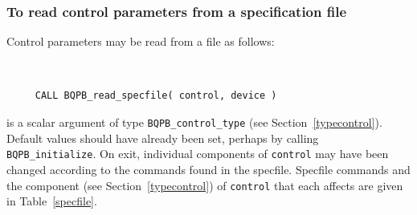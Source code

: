 \documentclass{galahad}
\newcommand{\packagename}{BQPB}
\begin{document}
\subsubsection{To read control parameters from a specification file}
\label{readspec}

Control parameters may be read from a file as follows:
\hskip0.5in

\def\baselinestretch{0.8}
{\tt
\begin{verbatim}
     CALL BQPB_read_specfile( control, device )
\end{verbatim}
}
\def\baselinestretch{1.0}

\begin{description}
 is a scalar \intentinout argument of type
{\tt \packagename\_control\_type}
(see Section~\ref{typecontrol}).
Default values should have already been set, perhaps by calling
{\tt \packagename\_initialize}.
On exit, individual components of {\tt control} may have been changed
according to the commands found in the specfile. Specfile commands and
the component (see Section~\ref{typecontrol}) of {\tt control}
that each affects are given in Table~\ref{specfile}.


\end{description}
\end{document}
